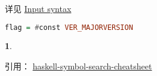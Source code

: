 \documentclass[UTF8]{ctexart}
\theoremstyle{sybs}
\newtheorem{syb}{}
\begin{document}
详见
\href{https://downloads.haskell.org/ghc/latest/docs/users_guide/utils.html#input-syntax}{Input syntax}

\begin{lstlisting}[language=Haskell]
  flag = #const VER_MAJORVERSION
\end{lstlisting}

\begin{syb}
\end{syb}


引用：
\href{https://github.com/takenobu-hs/haskell-symbol-search-cheatsheet}{haskell-symbol-search-cheatsheet}
\end{document}
